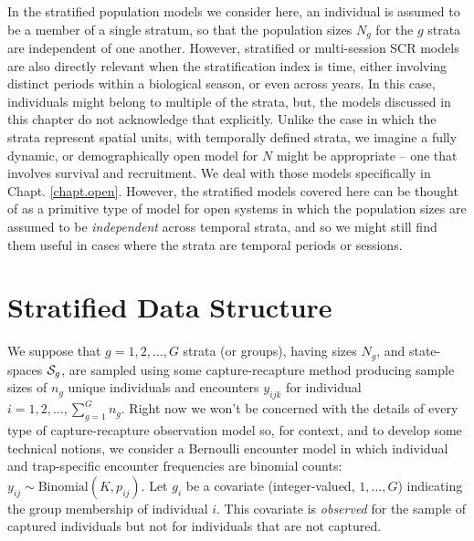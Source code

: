 In the stratified population models we consider here, an individual is
assumed to be a member of a single stratum, so that the population
sizes $N_{g}$ for the $g$ strata  are independent of one another. However,
stratified or multi-session SCR models are also directly relevant when
the stratification index is time, either involving distinct periods within
a biological season, or even across years. In this case, individuals
might belong to multiple of the strata, but, the models discussed in
this chapter do not acknowledge that explicitly.
Unlike the case in which the strata represent spatial units, with
temporally defined strata, we imagine a fully dynamic, or
demographically open model for $N$ might be appropriate -- one that
involves survival and recruitment. We deal with those models
specifically in Chapt. \ref{chapt.open}.  However, the stratified
models covered here can be thought of as a primitive type of model for
open systems in which the population sizes are assumed to be {\it
  independent} across temporal strata, and so we might still find them
useful in cases where the strata are temporal periods or sessions.

\section{Stratified Data Structure}


We suppose that $g=1,2,\ldots,G$ strata (or groups), having sizes
$N_{g}$, and state-spaces ${\cal S}_{g}$, are sampled using some
capture-recapture method producing sample sizes of $n_{g}$ unique
individuals and encounters $y_{ijk}$ for individual $i=1,2,\ldots,
\sum_{g=1}^{G} n_{g}$.  Right now we won't be concerned with the
details of every type of capture-recapture observation model so, for
context, and to develop some technical notions, we consider a
Bernoulli encounter model in which individual and trap-specific
encounter frequencies are binomial counts: $y_{ij} \sim
\mbox{Binomial}(K,p_{ij})$.  Let $g_{i}$ be a covariate
(integer-valued, $1, \ldots, G$) indicating the group membership of
individual $i$. This covariate is {\it observed} for the sample of
captured individuals but not for individuals that are not captured.

